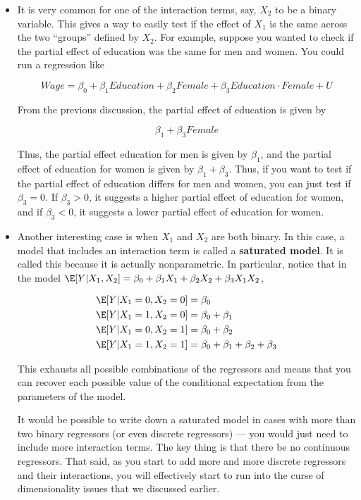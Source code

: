 \documentclass[
  letterpaper,
  DIV=11,
  numbers=noendperiod]{scrreprt}
\begin{document}
\begin{itemize}
\item
  It is very common for one of the interaction terms, say, \(X_2\) to be
  a binary variable. This gives a way to easily test if the effect of
  \(X_1\) is the same across the two ``groups'' defined by \(X_2\). For
  example, suppose you wanted to check if the partial effect of
  education was the same for men and women. You could run a regression
  like

  \[
      Wage = \beta_0 + \beta_1 Education + \beta_2 Female + \beta_3 Education \cdot Female + U
    \]

  From the previous discussion, the partial effect of education is given
  by

  \[
      \beta_1 + \beta_3 Female
    \]

  Thus, the partial effect education for men is given by \(\beta_1\),
  and the partial effect of education for women is given by
  \(\beta_1 + \beta_3\). Thus, if you want to test if the partial effect
  of education differs for men and women, you can just test if
  \(\beta_3=0\). If \(\beta_3>0\), it suggests a higher partial effect
  of education for women, and if \(\beta_3 < 0\), it suggests a lower
  partial effect of education for women.
\item
  Another interesting case is when \(X_1\) and \(X_2\) are both binary.
  In this case, a model that includes an interaction term is called a
  \textbf{saturated model}. It is called this because it is actually
  nonparametric. In particular, notice that in the model
  \(\E[Y|X_1,X_2] = \beta_0 + \beta_1 X_1 + \beta_2 X_2 + \beta_3 X_1 X_2\),

  \[
    \begin{aligned}
      \E[Y|X_1=0,X_2=0] &= \beta_0 \\
      \E[Y|X_1=1,X_2=0] &= \beta_0 + \beta_1 \\
      \E[Y|X_1=0,X_2=1] &= \beta_0 + \beta_2 \\
      \E[Y|X_1=1,X_2=1] &= \beta_0 + \beta_1 + \beta_2 + \beta_3
    \end{aligned}
    \]

  This exhausts all possible combinations of the regressors and means
  that you can recover each possible value of the conditional
  expectation from the parameters of the model.

  It would be possible to write down a saturated model in cases with
  more than two binary regressors (or even discrete regressors) --- you
  would just need to include more interaction terms. The key thing is
  that there be no continuous regressors. That said, as you start to add
  more and more discrete regressors and their interactions, you will
  effectively start to run into the curse of dimensionality issues that
  we discussed earlier.


\end{itemize}
\end{document}
